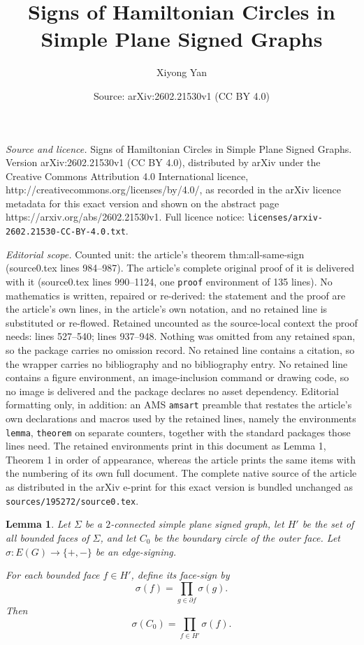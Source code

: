 \documentclass[10pt,a4paper]{amsart}
\title{Signs of Hamiltonian Circles in Simple Plane Signed Graphs}
\author{Xiyong Yan}
\date{Source: arXiv:2602.21530v1 (CC BY 4.0)}
\newtheorem{lemma}{Lemma}
\begin{document}
\maketitle

\noindent\emph{Source and licence.} Signs of Hamiltonian Circles in Simple Plane Signed Graphs. Version arXiv:2602.21530v1 (CC BY 4.0), distributed by arXiv under the Creative Commons Attribution 4.0 International licence, http://creativecommons.org/licenses/by/4.0/, as recorded in the arXiv licence metadata for this exact version and shown on the abstract page https://arxiv.org/abs/2602.21530v1. Full licence notice: \texttt{licenses/arxiv-2602.21530-CC-BY-4.0.txt}.\par\smallskip

\noindent\textit{Editorial scope.} Counted unit: the article's theorem thm:all-same-sign (source0.tex lines 984--987). The article's complete original proof of it is delivered with it (source0.tex lines 990--1124, one \texttt{proof} environment of 135 lines). No mathematics is written, repaired or re-derived: the statement and the proof are the article's own lines, in the article's own notation, and no retained line is substituted or re-flowed.  Retained uncounted as the source-local context the proof needs: lines 527--540; lines 937--948.  Nothing was omitted from any retained span, so the package carries no omission record.  No retained line contains a citation, so the wrapper carries no bibliography and no bibliography entry.  No retained line contains a figure environment, an image-inclusion command or drawing code, so no image is delivered and the package declares no asset dependency.  Editorial formatting only, in addition: an AMS \texttt{amsart} preamble that restates the article's own declarations and macros used by the retained lines, namely the environments \texttt{lemma}, \texttt{theorem} on separate counters, together with the standard packages those lines need.  The retained environments print in this document as Lemma 1, Theorem 1 in order of appearance, whereas the article prints the same items with the numbering of its own full document.  The complete native source of the article as distributed in the arXiv e-print for this exact version is bundled unchanged as \texttt{sources/195272/source0.tex}.
\begin{lemma}\label{facegraph}
Let $\Sigma$ be a $2$-connected simple plane signed graph, let $H'$ be the set of all bounded faces of $\Sigma$,
and let $C_0$ be the boundary circle of the outer face.
Let $\sigma:E(G)\to\{+,-\}$ be an edge-signing.

For each bounded face $f\in H'$, define its face-sign by
\[
\sigma(f)=\prod_{g\in \partial f}\sigma(g).
\]
Then
\[
\sigma(C_0)=\prod_{f\in H'} \sigma(f).
\]
\end{lemma}
\end{document}
